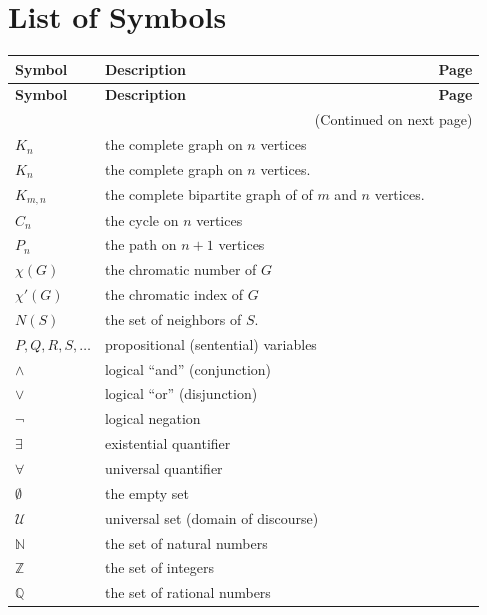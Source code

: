 \documentclass[10pt,]{book}
\theoremstyle{plain}
\theoremstyle{definition}
\theoremstyle{definition}
\theoremstyle{definition}
\numberwithin{equation}{chapter}
\def\N{\mathbb N}
\def\Z{\mathbb Z}
\def\Q{\mathbb Q}
\def\U{\mathcal U}
\begin{document}
\chapter[{List of Symbols}]{List of Symbols}\label{appendix-5}
\begin{longtable}[l]{lp{}r}
\textbf{Symbol}&\textbf{Description}&\textbf{Page}\\[1em]
\endfirsthead
\textbf{Symbol}&\textbf{Description}&\textbf{Page}\\[1em]
\endhead
\multicolumn{3}{r}{(Continued on next page)}\\
\endfoot
\endlastfoot
\(K_n\)&the complete graph on \(n\) vertices&\pageref{notation-1}\\
\(K_n\)&the complete graph on \(n\) vertices.&\pageref{notation-2}\\
\(K_{m,n}\)&the complete bipartite graph of of \(m\) and \(n\) vertices.&\pageref{notation-3}\\
\(C_n\)&the cycle on \(n\) vertices&\pageref{notation-4}\\
\(P_n\)&the path on \(n+1\) vertices&\pageref{notation-5}\\
\(\chi(G)\)&the chromatic number of \(G\)&\pageref{notation-6}\\
\(\chi'(G)\)&the chromatic index of \(G\)&\pageref{notation-7}\\
\(N(S)\)&the set of neighbors of \(S\).&\pageref{notation-8}\\
\(P, Q, R, S, \ldots\)&propositional (sentential) variables&\pageref{notation-9}\\
\(\wedge\)&logical ``and'' (conjunction)&\pageref{notation-10}\\
\(\vee\)&logical ``or'' (disjunction)&\pageref{notation-11}\\
\(\neg\)&logical negation&\pageref{notation-12}\\
\(\exists\)&existential quantifier&\pageref{notation-13}\\
\(\forall\)&universal quantifier&\pageref{notation-14}\\
\(\emptyset\)&the empty set&\pageref{notation-15}\\
\(\U\)&universal set (domain of discourse)&\pageref{notation-16}\\
\(\N\)&the set of natural numbers&\pageref{notation-17}\\
\(\Z\)&the set of integers&\pageref{notation-18}\\
\(\Q\)&the set of rational numbers&\pageref{notation-19}\\

\end{longtable}
\end{document}
